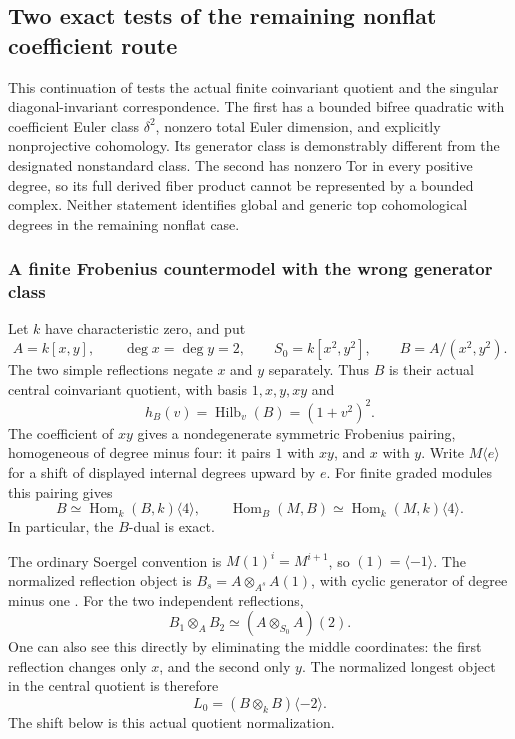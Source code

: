 \subsection{Two exact tests of the remaining nonflat coefficient route}

This continuation of  tests the actual finite
coinvariant quotient and the singular diagonal-invariant
correspondence. The first has a bounded bifree quadratic
with coefficient Euler class \(\delta^2\), nonzero total
Euler dimension, and explicitly nonprojective cohomology.
Its generator class is demonstrably different from the
designated nonstandard class. The second has nonzero Tor
in every positive degree, so its full derived fiber product
cannot be represented by a bounded complex.
Neither statement identifies global and generic top
cohomological degrees in the remaining nonflat case.

\subsubsection{A finite Frobenius countermodel with the wrong generator class}

Let \(k\) have characteristic zero, and put
\[
 A=k[x,y],\qquad \deg x=\deg y=2,\qquad
 S_0=k[x^2,y^2],\qquad B=A/(x^2,y^2).
\]
The two simple reflections negate \(x\) and \(y\)
separately. Thus \(B\) is their actual central
coinvariant quotient, with basis \(1,x,y,xy\) and
\[
 h_B(v)=\operatorname{Hilb}_v(B)=(1+v^2)^2.
\]
The coefficient of \(xy\) gives a nondegenerate
symmetric Frobenius pairing, homogeneous of degree
minus four: it pairs \(1\) with \(xy\), and \(x\)
with \(y\). Write \(M\langle e\rangle\) for a shift
of displayed internal degrees upward by \(e\).
For finite graded modules this pairing gives
\begin{equation}\label{eq:QRBdual}
 B\simeq\operatorname{Hom}_k(B,k)\langle4\rangle,
 \qquad
 \operatorname{Hom}_B(M,B)
       \simeq\operatorname{Hom}_k(M,k)\langle4\rangle.
\end{equation}
In particular, the \(B\)-dual is exact.

The ordinary Soergel convention is
\(M(1)^i=M^{i+1}\), so \((1)=\langle-1\rangle\).
The normalized reflection object is
\(B_s=A\otimes_{A^s}A(1)\), with cyclic generator
of degree minus one
\cite[\S3.3, p.~1105; \S3.4, p.~1106]{EW}.
For the two independent reflections,
\[
 B_1\otimes_A B_2\simeq(A\otimes_{S_0}A)(2).
\]
One can also see this directly by eliminating the
middle coordinates: the first reflection changes
only \(x\), and the second only \(y\).
The normalized longest object in the central
quotient is therefore
\begin{equation}\label{eq:QRlongest}
                  L_0=(B\otimes_k B)\langle-2\rangle.
\end{equation}
The shift below is this actual quotient normalization.

